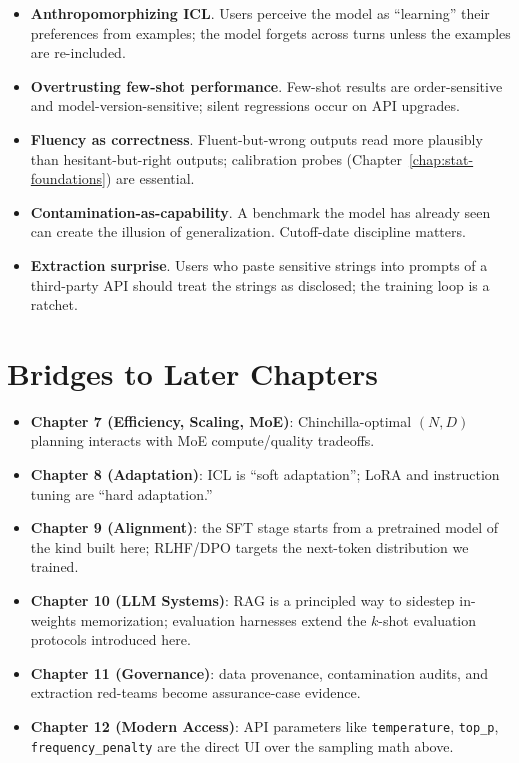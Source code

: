 \begin{itemize}
  \item \textbf{Anthropomorphizing ICL}. Users perceive the model as
        ``learning'' their preferences from examples; the model
        forgets across turns unless the examples are re-included.
  \item \textbf{Overtrusting few-shot performance}. Few-shot results
        are order-sensitive and model-version-sensitive; silent
        regressions occur on API upgrades.
  \item \textbf{Fluency as correctness}. Fluent-but-wrong outputs
        read more plausibly than hesitant-but-right outputs;
        calibration probes (Chapter~\ref{chap:stat-foundations}) are essential.
  \item \textbf{Contamination-as-capability}. A benchmark the model
        has already seen can create the illusion of generalization.
        Cutoff-date discipline matters.
  \item \textbf{Extraction surprise}. Users who paste sensitive
        strings into prompts of a third-party API should treat the
        strings as disclosed; the training loop is a ratchet.
\end{itemize}

\section{Bridges to Later Chapters}

\begin{itemize}
  \item \textbf{Chapter 7 (Efficiency, Scaling, MoE)}: Chinchilla-optimal
        $(N, D)$ planning interacts with MoE compute/quality tradeoffs.
  \item \textbf{Chapter 8 (Adaptation)}: ICL is ``soft adaptation''; LoRA
        and instruction tuning are ``hard adaptation.''
  \item \textbf{Chapter 9 (Alignment)}: the SFT stage starts from a
        pretrained model of the kind built here; RLHF/DPO targets the
        next-token distribution we trained.
  \item \textbf{Chapter 10 (LLM Systems)}: RAG is a principled way to
        sidestep in-weights memorization; evaluation harnesses
        extend the $k$-shot evaluation protocols introduced here.
  \item \textbf{Chapter 11 (Governance)}: data provenance, contamination
        audits, and extraction red-teams become assurance-case
        evidence.
  \item \textbf{Chapter 12 (Modern Access)}: API parameters like
        \texttt{temperature}, \texttt{top\_p}, \texttt{frequency\_penalty}
        are the direct UI over the sampling math above.
\end{itemize}

